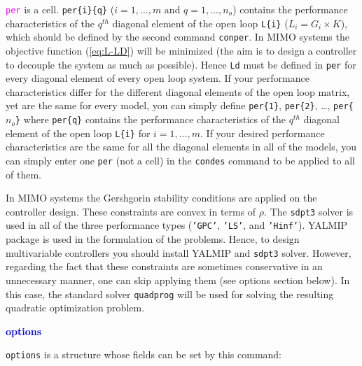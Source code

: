 \documentclass [12pt , a4paper] {article}
\begin{document}
\textcolor{magenta}{\texttt{per}} is a cell. \texttt{per\{i\}\{q\}} ($i=1,\ldots,m$ and $q=1,\ldots,n_o$) contains the performance characteristics of the $q^{th}$ diagonal element of the open loop \texttt{L\{i\}} ($L_i=G_i \times K$), which should be defined by the second command \texttt{conper}. In MIMO systems the objective function (\ref{eq:L-LD}) will be minimized (the aim is to design a controller to decouple the system as much as possible). Hence \texttt{Ld} must be defined in \texttt{per} for every diagonal element of every open loop system. If your performance characteristics differ for the different diagonal elements of the open loop matrix, yet are the same for every model, you can simply define \texttt{per\{1\}}, \texttt{per\{2\}}, \dots, \texttt{per\{$n_o$\}} where \texttt{per\{q\}} contains the performance characteristics of the $q^{th}$ diagonal element of the open loop \texttt{L\{i\}} for $i=1,\ldots,m$. If your desired performance characteristics are the same for all the diagonal elements in all of the models, you can simply enter one \texttt{per} (not a cell) in the \texttt{condes} command to be applied to all of them.

In MIMO systems the Gershgorin stability conditions are applied on the controller design. These constraints are convex in terms of $\rho$. The \texttt{sdpt3} solver is used in all of the three performance types (\texttt{'GPC'}, \texttt{'LS'}, and \texttt{'Hinf'}). YALMIP package is used in the formulation of the problems. Hence, to design multivariable controllers you should install YALMIP and \texttt{sdpt3} solver. However, regarding the fact that these constraints are sometimes conservative in an unnecessary manner, one can skip applying them (see options section below). In this case, the standard solver \texttt{quadprog} will be used for solving the resulting quadratic optimization problem.

\textcolor{blue}{\textbf{options}}

\texttt{options} is a structure whose fields can be set by this command:
\end{document}
